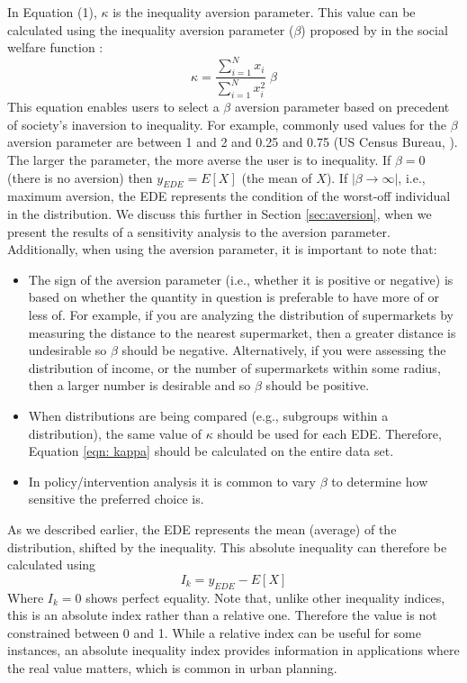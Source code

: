 \documentclass[final,3p,times,onecolumn,sort&compress]{elsarticle}
\begin{document}
In Equation (1), $\kappa$ is the inequality aversion parameter.
This value can be calculated using the inequality aversion parameter ($\beta$) proposed by \cite{Atkinson1970-mr} in the social welfare function \citep{Sheriff2020-ge}:
\begin{equation}
    \label{eqn: kappa}
    \kappa = \frac{\sum_{i=1}^N x_i}{\sum_{i=1}^N x_i^2} \; \beta 
\end{equation}
This equation enables users to select a $\beta$ aversion parameter based on precedent of society's inaversion to inequality.
For example, commonly used values for the $\beta$ aversion parameter are between 1 and 2 \citep{Atkinson1970-mr} and 0.25 and 0.75 (US Census Bureau, \cite{Jones2000-xv}).
The larger the parameter, the more averse the user is to inequality.
If $\beta=0$ (there is no aversion) then $y_{EDE}=E[X]$ (the mean of $X$). 
If $\left| \beta \rightarrow \infty \right|$, i.e., maximum aversion, the EDE represents the condition of the worst-off individual in the distribution. 
We discuss this further in Section \ref{sec:aversion}, when we present the results of a sensitivity analysis to the aversion parameter.
Additionally, when using the aversion parameter, it is important to note that:
\begin{itemize}
    \item The sign of the aversion parameter (i.e., whether it is positive or negative) is based on whether the quantity in question is preferable to have more of or less of.
For example, if you are analyzing the distribution of supermarkets by measuring the distance to the nearest supermarket, then a greater distance is undesirable so $\beta$ should be negative.
Alternatively, if you were assessing the distribution of income, or the number of supermarkets within some radius, then a larger number is desirable and so $\beta$ should be positive.
    \item When distributions are being compared (e.g., subgroups within a distribution), the same value of $\kappa$ should be used for each EDE. Therefore, Equation \ref{eqn: kappa} should be calculated on the entire data set.
    \item In policy/intervention analysis it is common to vary $\beta$ to determine how sensitive the preferred choice is.
\end{itemize}

As we described earlier, the EDE represents the mean (average) of the distribution, shifted by the inequality.
This absolute inequality can therefore be calculated using
\begin{equation}
    I_k = y_{EDE} - E[X]
\end{equation}
Where $I_k = 0$ shows perfect equality.
Note that, unlike other inequality indices, this is an absolute index rather than a relative one.
Therefore the value is not constrained between 0 and 1.
While a relative index can be useful for some instances, an absolute inequality index provides information in applications where the real value matters, which is common in urban planning.
\end{document}
